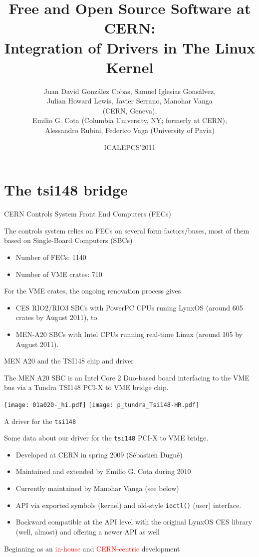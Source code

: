 \documentclass[compress,red]{beamer}
\title[FOSS at CERN: Drivers in the Kernel]%
	{Free and Open Source Software at CERN:\\
	Integration of Drivers in The Linux Kernel}
\author[David Cobas et al.]{%
	Juan David Gonz\'alez Cobas, Samuel Iglesias Gons\'alvez,\\
	Julian Howard Lewis, Javier Serrano, Manohar Vanga\\
		(CERN, Geneva),\\
	Emilio G. Cota (Columbia University, NY; formerly at CERN),\\
	Alessandro Rubini, Federico Vaga (University of Pavia)}
\date{ICALEPCS'2011}
\begin{document}
\begin{frame}
\titlepage
\end{frame}

\section{The tsi148 bridge}
\begin{frame}{CERN Controls System Front End Computers (FECs)}

The controls system relies on FECs on several form factors/buses,
most of them based on Single-Board Computers (SBCs)

\begin{itemize}
\item Number of FECs: 1140
\item Number of VME crates: 710
\end{itemize}

For the VME crates, the ongoing renovation process gives
\begin{itemize}
\item CES RIO2/RIO3 SBCs with PowerPC CPUs runing
LynxOS (around 605 crates by August 2011), to
\item MEN-A20 SBCs with Intel CPUs running real-time
Linux (around 105 by August 2011).
\end{itemize}
\end{frame}


\begin{frame}{MEN A20 and the TSI148 chip and driver}

The MEN A20 SBC is an Intel Core 2 Duo-based board interfacing to the
VME bus via a Tundra TSI148 PCI-X to VME bridge chip.

\begin{center}
\texttt{[image: 01a020-\_hi.pdf]} \qquad
\texttt{[image: p\_tundra\_Tsi148-HR.pdf]}
\end{center}
\end{frame}

\begin{frame}{A driver for the \texttt{tsi148}}

Some data about our driver for the \texttt{tsi148} PCI-X to VME bridge.
\begin{itemize}
\pause\item Developed at CERN in spring 2009 (S\'ebastien Dugu\'e)
\pause\item Maintained and extended by Emilio G. Cota during 2010
\pause\item Currently maintained by Manohar Vanga (see below)
\pause\item API via exported symbols (kernel) and old-style \texttt{ioctl()} (user) interface.
\pause\item Backward compatible at the API level with the original LynxOS CES
    library (well, almost) and offering a newer API as well
\end{itemize}

\pause Beginning as an \textcolor{red}{in-house}
and \textcolor{red}{CERN-centric} development
\end{frame}
\end{document}
